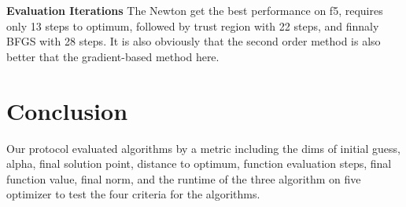 \documentclass[12pt]{article}
\begin{document}
\textbf{Evaluation Iterations}  
The Newton get the best performance on f5, requires only 13 steps to optimum, followed by trust region with 22 steps, and finnaly BFGS with 28 steps. It is also obviously that the second order method is also better that the gradient-based method here.

\begin{table}[h]
    \centering
    \caption{Optimization results for the Sum of Different Powers Function.}
    \label{tab:f5}
\end{table}




\section{Conclusion}

Our protocol evaluated algorithms by a metric including the dims of initial guess, alpha, final solution point, distance to optimum, function evaluation steps, final function value, final norm, and the runtime of the three algorithm on five optimizer to test the four criteria for the algorithms. 
\end{document}
